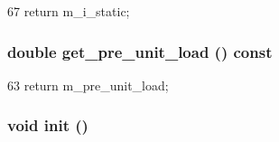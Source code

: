 \begin{DoxyCode}
67 { return m_i_static; }
\end{DoxyCode}
\hypertarget{classBitlineUnit_a9cc5aacc0ad37d1666dd8397d3369723}{
\subsubsection[{get\_\-pre\_\-unit\_\-load}]{\setlength{\rightskip}{0pt plus 5cm}double get\_\-pre\_\-unit\_\-load () const}}
\label{classBitlineUnit_a9cc5aacc0ad37d1666dd8397d3369723}



\begin{DoxyCode}
63 { return m_pre_unit_load; }
\end{DoxyCode}
\hypertarget{classBitlineUnit_a02fd73d861ef2e4aabb38c0c9ff82947}{
\subsubsection[{init}]{\setlength{\rightskip}{0pt plus 5cm}void init ()}}
\label{classBitlineUnit_a02fd73d861ef2e4aabb38c0c9ff82947}



